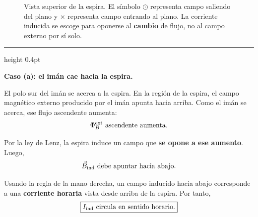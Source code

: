 \documentclass[11pt]{article}
\newcommand{\soluciontitulo}{%
  \par\medskip
  \noindent{\large\bfseries Solución.}\par
  \vspace{0.2em}\hrule height 0.4pt \vspace{0.7em}%
}
\newcommand{\paso}[1]{%
  \par\medskip
  \noindent\textbf{#1}\par
  \vspace{0.1em}%
}
\newcommand{\Bsale}[2]{%
    \draw[fieldblue,line width=0.55pt] (#1,#2) circle (0.11);
    \fill[fieldblue] (#1,#2) circle (0.03);
}
\begin{document}
\begin{figure}[H]
\caption{Vista superior de la espira. El s\'imbolo $\odot$ representa campo saliendo del plano y $\times$ representa campo entrando al plano. La corriente inducida se escoge para oponerse al \textbf{cambio} de flujo, no al campo externo por s\'i solo.}
\label{fig:p1_lenz}
\end{figure}




\soluciontitulo

\paso{Caso (a): el im\'an cae hacia la espira.}
El polo sur del im\'an se acerca a la espira. En la regi\'on de la espira, el campo magn\'etico externo producido por el im\'an apunta hacia arriba. Como el im\'an se acerca, ese flujo ascendente aumenta:
\begin{equation*}
    \Phi_B^{\rm ext}\ \text{ascendente aumenta}.
\end{equation*}

Por la ley de Lenz, la espira induce un campo que \textbf{se opone a ese aumento}. Luego,
\begin{equation*}
    \vec B_{\rm ind}\ \text{debe apuntar hacia abajo}.
\end{equation*}

Usando la regla de la mano derecha, un campo inducido hacia abajo corresponde a una \textbf{corriente horaria} vista desde arriba de la espira. Por tanto,
\begin{equation*}
    \boxed{I_{\rm ind}\ \text{circula en sentido horario}.}
\end{equation*}
\end{document}
